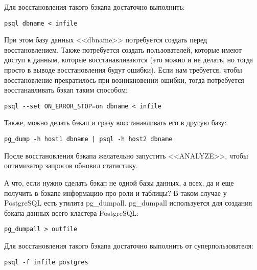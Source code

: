 Для восстановления такого бэкапа достаточно выполнить:
\begin{lstlisting}[label=lst:backups2,caption=Восстанавливаем бэкап]
psql dbname < infile
\end{lstlisting}

При этом базу данных <<dbname>> потребуется создать перед восстановлением. Также потребуется создать пользователей,
которые имеют доступ к данным, которые восстанавливаются (это можно и не делать, но тогда просто в выводе восстановления будут ошибки).
Если нам требуется, чтобы восстановление прекратилось при возникновении ошибки, тогда потребуется восстанавливать бэкап таким способом:
\begin{lstlisting}[label=lst:backups3,caption=Восстанавливаем бэкап]
psql --set ON_ERROR_STOP=on dbname < infile
\end{lstlisting}

Также, можно делать бэкап и сразу восстанавливать его в другую базу:
\begin{lstlisting}[label=lst:backups4,caption=Бекап в другую БД]
pg_dump -h host1 dbname | psql -h host2 dbname
\end{lstlisting}

После восстановления бэкапа желательно запустить <<ANALYZE>>, чтобы оптимизатор запросов обновил статистику.

А что, если нужно сделать бэкап не одной базы данных, а всех, да и еще получить в бэкапе информацию про роли и таблицы?
В таком случае у PostgreSQL есть утилита pg\_dumpall. pg\_dumpall используется для создания бэкапа данных всего кластера PostgreSQL:
\begin{lstlisting}[label=lst:backups5,caption=Бекап кластера PostgreSQL]
pg_dumpall > outfile
\end{lstlisting}

Для восстановления такого бэкапа достаточно выполнить от суперпользователя:
\begin{lstlisting}[label=lst:backups6,caption=Восстановления бэкапа PostgreSQL]
psql -f infile postgres
\end{lstlisting}

